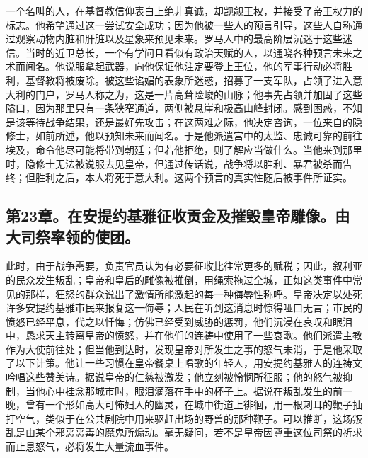 一个名叫的人，在基督教信仰表白上绝非真诚，却觊觎王权，并接受了帝王权力的标志。他希望通过这一尝试安全成功；因为他被一些人的预言引导，这些人自称通过观察动物内脏和肝脏以及星象来预见未来。罗马人中的最高阶层沉迷于这些迷信。当时的近卫总长，一个有学问且看似有政治天赋的人，以通晓各种预言未来之术而闻名。他说服拿起武器，向他保证他注定要登上王位，他的军事行动必将胜利，基督教将被废除。被这些谄媚的表象所迷惑，招募了一支军队，占领了进入意大利的门户，罗马人称之为，这是一片高耸险峻的山脉；他事先占领并加固了这些隘口，因为那里只有一条狭窄通道，两侧被悬崖和极高山峰封闭。感到困惑，不知是该等待战争结果，还是最好先攻击；在这两难之际，他决定咨询，一位来自的隐修士，如前所述，他以预知未来而闻名。于是他派遣宫中的太监、忠诚可靠的前往埃及，命令他尽可能将带到朝廷；但若他拒绝，则了解应当做什么。当他来到那里时，隐修士无法被说服去见皇帝，但通过传话说，战争将以胜利、暴君被杀而告终；但胜利之后，本人将死于意大利。这两个预言的真实性随后被事件所证实。\par


\subsection{第23章。在安提约基雅征收贡金及摧毁皇帝雕像。由大司祭率领的使团。}

此时，由于战争需要，负责官员认为有必要征收比往常更多的赋税；因此，叙利亚的民众发生叛乱；皇帝和皇后的雕像被推倒，用绳索拖过全城，正如这类事件中常见的那样，狂怒的群众说出了激情所能激起的每一种侮辱性称呼。皇帝决定以处死许多安提约基雅市民来报复这一侮辱；人民在听到这消息时惊得哑口无言；市民的愤怒已经平息，代之以忏悔；仿佛已经受到威胁的惩罚，他们沉浸在哀叹和眼泪中，恳求天主转离皇帝的愤怒，并在他们的连祷中使用了一些哀歌。他们派遣主教作为大使前往处；但当他到达时，发现皇帝对所发生之事的怒气未消，于是他采取了以下计策。他让一些习惯在皇帝餐桌上唱歌的年轻人，用安提约基雅人的连祷文吟唱这些赞美诗。据说皇帝的仁慈被激发；他立刻被怜悯所征服；他的怒气被抑制，当他心中挂念那城市时，眼泪滴落在手中的杯子上。据说在叛乱发生的前一晚，曾有一个形如高大可怖妇人的幽灵，在城中街道上徘徊，用一根刺耳的鞭子抽打空气，类似于在公共剧院中用来驱赶出场的野兽的那种鞭子。可以推断，这场叛乱是由某个邪恶恶毒的魔鬼所煽动。毫无疑问，若不是皇帝因尊重这位司祭的祈求而止息怒气，必将发生大量流血事件。\par

